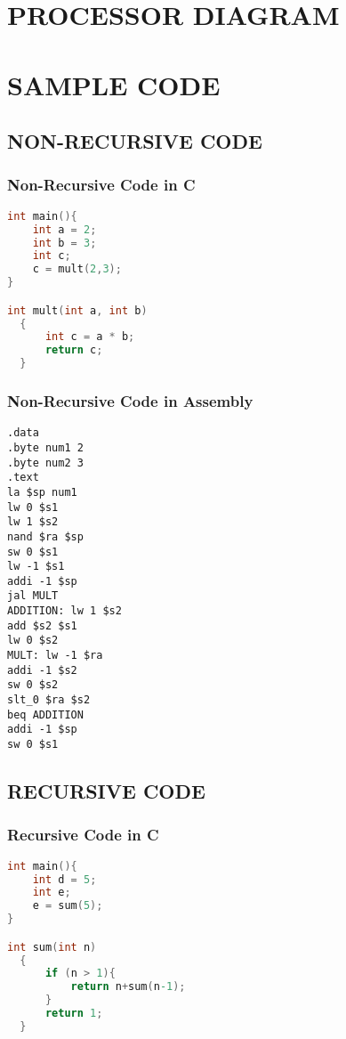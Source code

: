 \documentclass[11pt, titlepage]{article}
\begin{document}
\section{PROCESSOR DIAGRAM}

\newpage
\section{SAMPLE CODE}
\subsection{NON-RECURSIVE CODE}
\subsubsection{Non-Recursive Code in C}
\begin{lstlisting}[language = C]
int main(){
	int a = 2;
	int b = 3;
	int c;
	c = mult(2,3);
}

int mult(int a, int b)
  {
      int c = a * b;
      return c;
  }
\end{lstlisting}
\subsubsection{Non-Recursive Code in Assembly}
\begin{lstlisting}[language=Ant]
.data 
.byte num1 2
.byte num2 3
.text
la $sp num1
lw 0 $s1
lw 1 $s2
nand $ra $sp
sw 0 $s1
lw -1 $s1
addi -1 $sp 
jal MULT
ADDITION: lw 1 $s2	
add $s2 $s1
lw 0 $s2
MULT: lw -1 $ra
addi -1 $s2
sw 0 $s2
slt_0 $ra $s2
beq ADDITION
addi -1 $sp
sw 0 $s1
\end{lstlisting}

\subsection{RECURSIVE CODE}
\subsubsection{Recursive Code in C}
\begin{lstlisting}[language = C]
int main(){
	int d = 5;
	int e;
	e = sum(5);
}

int sum(int n)
  {
      if (n > 1){
          return n+sum(n-1);
      }
      return 1;
  }
\end{lstlisting}
\end{document}
